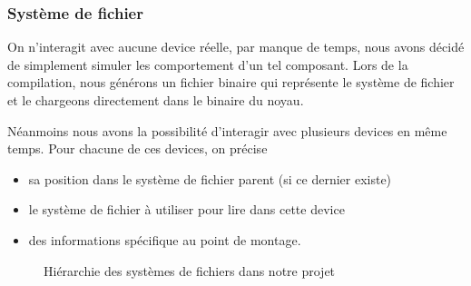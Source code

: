 \documentclass[10pt,a4paper]{beamer}
\begin{document}
\begin{frame}
  \frametitle{Système de fichier}

  On n'interagit avec aucune device réelle, par manque de temps, nous avons décidé de simplement simuler les comportement d'un tel composant. Lors de la compilation, nous générons un fichier binaire qui représente le système de fichier et le chargeons directement dans le binaire du noyau.


  Néanmoins nous avons la possibilité d'interagir avec plusieurs devices en même temps. Pour chacune de ces devices, on précise
  \begin{itemize}
  \item sa position dans le système de fichier parent (si ce dernier existe)
  \item le système de fichier à utiliser pour lire dans cette device
  \item des informations spécifique au point de montage.
  \end{itemize}

  \begin{figure}
    \begin{center}
      \caption{Hiérarchie des systèmes de fichiers dans notre projet}
    \end{center}
  \end{figure}

\end{frame}
\end{document}
